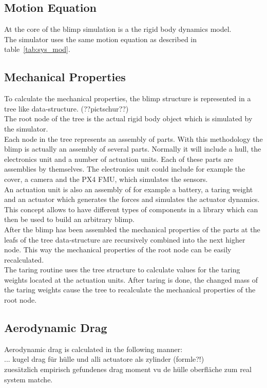 \subsection{Motion Equation}
\label{sub:motion_equation}
At the core of the blimp simulation is a the rigid body dynamics model. \\
The simulator uses the same motion equation as described in table~\ref{tab:sys_mod}.\\

\subsection{Mechanical Properties}
\label{sub:mech_properties}
To calculate the mechanical properties, the blimp structure is represented in a tree like data-structure. (??pictschur??)\\
The root node of the tree is the actual rigid body object which is simulated by the simulator.\\
Each node in the tree represents an assembly of parts.
With this methodology the blimp is actually an assembly of several parts. 
Normally it will include a hull, the electronics unit and a number of actuation units.
Each of these parts are assemblies by themselves.
The electronics unit could include for example the cover, a camera and the PX4 FMU, which simulates the sensors.\\
An actuation unit is also an assembly of for example a battery, a taring weight and an actuator which generates the forces and simulates the actuator dynamics.\\
This concept allows to have different types of components in a library which can then be used to build an arbitrary blimp.\\
After the blimp has been assembled the mechanical properties of the parts at the leafs of the tree data-structure are recursively combined into the next higher node. 
This way the mechanical properties of the root node can be easily recalculated.\\
The taring routine uses the tree structure to calculate values for the taring weights located at the actuation units. 
After taring is done, the changed mass of the taring weights cause the tree to recalculate the mechanical properties of the root node.

\subsection{Aerodynamic Drag}
\label{sub:aero_drag}
Aerodynamic drag is calculated in the following manner:\\
... kugel drag für hülle und alli actuatore als zylinder (formle?!) \\
zuesätzlich empirisch gefundenes drag moment vu de hülle oberfläche zum real system matche. \\


